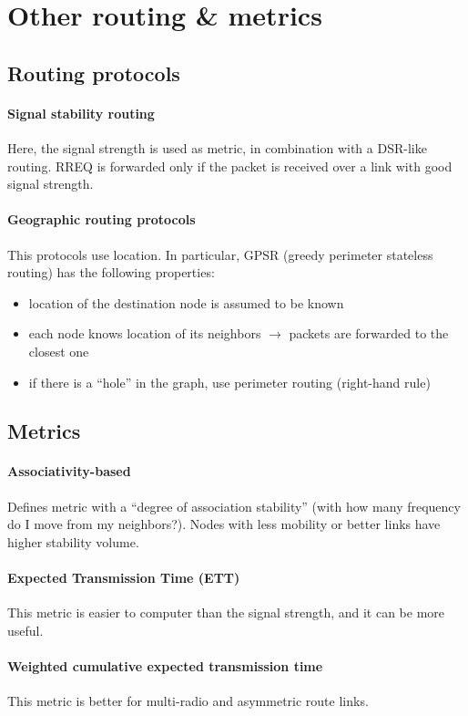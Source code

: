 \section{Other routing \& metrics}

\subsection{Routing protocols}

\paragraph*{Signal stability routing} Here, the signal strength is used as
metric, in combination with a DSR-like routing. RREQ is forwarded only if the
packet is received over a link with good signal strength.

\paragraph*{Geographic routing protocols} This protocols use location. In
particular, GPSR (greedy perimeter stateless routing) has the following
properties:
\begin{itemize}
\item location of the destination node is assumed to be known
\item each node knows location of its neighbors $\to$ packets are forwarded to
  the closest one
\item if there is a ``hole'' in the graph, use perimeter routing (right-hand
rule) 
\end{itemize}

\subsection{Metrics}

\paragraph*{Associativity-based} 
Defines metric with a ``degree of association stability'' (with how many
frequency do I move from my neighbors?). Nodes with less mobility or better
links have higher stability volume.

\paragraph*{Expected Transmission Time (ETT)} This metric is easier to computer
than the signal strength, and it can be more useful.

\paragraph*{Weighted cumulative expected transmission time} This metric is
better for multi-radio and asymmetric route links.
